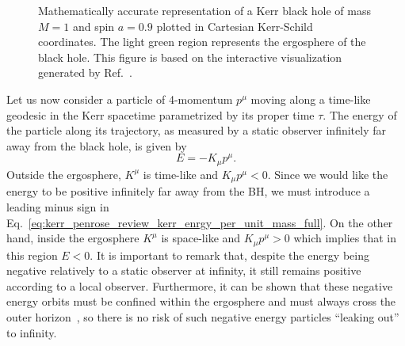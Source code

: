 \begin{figure}[!ht]
  \centering
  
  \caption{Mathematically accurate representation of a Kerr black hole of mass $M=1$ and spin $a=0.9$ plotted in Cartesian Kerr-Schild coordinates. The light green region represents the ergosphere of the black hole. This figure is based on the interactive visualization generated by Ref.~\cite{KerrSurfaceViz}.}
  \label{fig:kerr_penrose_review_kerr_surfaces}
\end{figure}

Let us now consider a particle of 4-momentum $p^\mu$ moving along a time-like geodesic in the Kerr spacetime parametrized by its proper time $\tau$. The energy of the particle along its trajectory, as measured by a static observer infinitely far away from the black hole, is given by
%
\begin{equation}
  E = -K_\mu p^\mu.
  \label{eq:kerr_penrose_review_kerr_enrgy_per_unit_mass_full}
\end{equation}
%
Outside the ergosphere, $K^\mu$ is time-like and $K_\mu p^\mu<0$. Since we would like the energy to be positive infinitely far away from the \ac{BH}, we must introduce a leading minus sign in Eq.~\eqref{eq:kerr_penrose_review_kerr_enrgy_per_unit_mass_full}. On the other hand, inside the ergosphere $K^\mu$ is space-like and $K_\mu p^\mu >0$ which implies that in this region $E < 0$. It is important to remark that, despite the energy being negative relatively to a static observer at infinity, it still remains positive according to a local observer. Furthermore, it can be shown that these negative energy orbits must be confined within the ergosphere and must always cross the outer horizon~\cite{Grib:2013hxa,Contopoulos1984}, so there is no risk of such negative energy particles ``leaking out'' to infinity.

